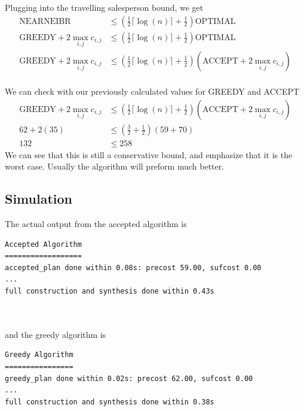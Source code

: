Plugging into the travelling salesperson bound, we get
\begin{align*}
\text{NEARNEIBR} &\leq (\frac{1}{2} \lceil \log(n) \rceil + \frac{1}{2}) \text{OPTIMAL} \\
\text{GREEDY} + 2\max_{i,j} c_{i,j} &\leq (\frac{1}{2} \lceil \log(n) \rceil + \frac{1}{2}) \text{OPTIMAL} \\
\text{GREEDY} + 2\max_{i,j} c_{i,j} &\leq (\frac{1}{2} \lceil \log(n) \rceil + \frac{1}{2}) (\text{ACCEPT} + 2 \max_{i,j} c_{i,j}) \\ 
\end{align*} 


We can check with our previously calculated values for GREEDY and ACCEPT
\begin{align*}
\text{GREEDY} + 2\max_{i,j} c_{i,j} &\leq (\frac{1}{2} \lceil \log(n) \rceil + \frac{1}{2}) (\text{ACCEPT} + 2 \max_{i,j} c_{i,j}) \\ 
62 + 2 (35) &\leq (\frac{3}{2} + \frac{1}{2})(59+70) \\
132 &\leq 258
\end{align*}
We can see that this is still a conservative bound, and emphasize that it is the worst case. Usually the algorithm will preform much better.

\subsection{Simulation}
The actual output from the accepted algorithm is \\


\begin{minipage}{\textwidth}
\begingroup
\fontsize{9pt}{12pt}\selectfont
\begin{lstlisting}
Accepted Algorithm
==================
accepted_plan done within 0.08s: precost 59.00, sufcost 0.00
...
full construction and synthesis done within 0.43s 
\end{lstlisting}
\endgroup
\end{minipage} \\ \\


and the greedy algorithm is \\


\begin{minipage}{\textwidth}
\begingroup
\fontsize{9pt}{12pt}\selectfont
\begin{lstlisting}
Greedy Algorithm
================
greedy_plan done within 0.02s: precost 62.00, sufcost 0.00
...
full construction and synthesis done within 0.38s 
\end{lstlisting}
\endgroup
\end{minipage} \\ \\


